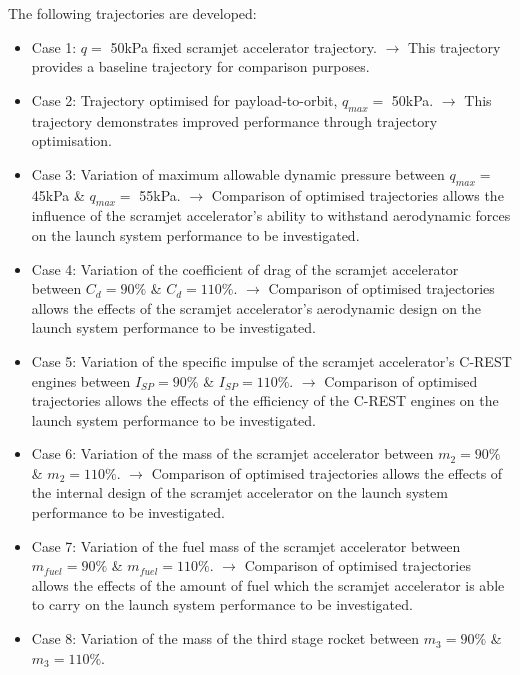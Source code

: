 The following trajectories are developed: 
\begin{itemize}
	
	\item Case 1: $q = $ 50kPa fixed scramjet accelerator trajectory. \newline$\rightarrow$ This trajectory provides a baseline trajectory for comparison purposes.
	\item Case 2: Trajectory optimised for payload-to-orbit, $q_{max} = $ 50kPa. \newline$\rightarrow$ This trajectory demonstrates improved performance through trajectory optimisation.
	\item Case 3: Variation of maximum allowable dynamic pressure between $q_{max} = $ 45kPa \& $q_{max} = $ 55kPa. 
	\newline$\rightarrow$ Comparison of optimised trajectories allows the influence of the scramjet accelerator's ability to withstand aerodynamic forces on the launch system performance to be investigated.
	\item Case 4: Variation of the coefficient of drag of the scramjet accelerator between $C_d = 90\%$ \& $C_d = 110\%$. 
	\newline$\rightarrow$ Comparison of optimised trajectories allows the effects of the scramjet accelerator's aerodynamic design on the launch system performance to be investigated.
	\item Case 5: Variation of the specific impulse of the scramjet accelerator's C-REST engines between $I_{SP} = 90\%$ \& $I_{SP} = 110\%$. 
	\newline$\rightarrow$ Comparison of optimised trajectories allows the effects of the efficiency of the C-REST engines on the launch system performance to be investigated. 
	\item Case 6: Variation of the mass of the scramjet accelerator between $m_2 = 90\%$ \& $m_2 = 110\%$. 
	\newline$\rightarrow$ Comparison of optimised trajectories allows the effects of the internal design of the scramjet accelerator on the launch system performance to be investigated. 
	\item Case 7: Variation of the fuel mass of the scramjet accelerator between $m_{fuel} = 90\%$ \& $m_{fuel} = 110\%$. 
	\newline$\rightarrow$ Comparison of optimised trajectories allows the effects of the amount of fuel which the scramjet accelerator is able to carry on the launch system performance to be investigated. 
	\item Case 8: Variation of the mass of the third stage rocket between $m_3 = 90\%$ \& $m_3 = 110\%$. 

\end{itemize}
